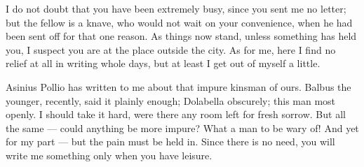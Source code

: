 

 I do not doubt that you have been extremely busy, since you sent me no letter; but the fellow is a knave, who would not wait on your convenience, when he had been sent off for that one reason. As things now stand, unless something has held you, I suspect you are at the place outside the city. As for me, here I find no relief at all in writing whole days, but at least I get out of myself a little.

 Asinius Pollio has written to me about that impure kinsman of ours. Balbus the younger, recently, said it plainly enough; Dolabella obscurely; this man most openly. I should take it hard, were there any room left for fresh sorrow. But all the same --- could anything be more impure? What a man to be wary of! And yet for my part --- but the pain must be held in. Since there is no need, you will write me something only when you have leisure.
